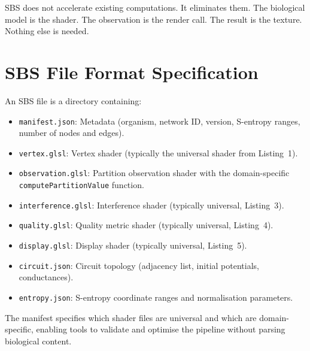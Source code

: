 \documentclass[11pt,twocolumn,a4paper]{article}
\begin{document}
SBS does not accelerate existing computations.  It eliminates them.
The biological model is the shader.  The observation is the render
call.  The result is the texture.  Nothing else is needed.








\appendix

\section{SBS File Format Specification}
\label{app:format}

An SBS file is a directory containing:

\begin{itemize}[leftmargin=*,nosep]
\item \texttt{manifest.json}: Metadata (organism, network ID, version,
  S-entropy ranges, number of nodes and edges).
\item \texttt{vertex.glsl}: Vertex shader (typically the universal
  shader from Listing~1).
\item \texttt{observation.glsl}: Partition observation shader with the
  domain-specific \texttt{computePartitionValue} function.
\item \texttt{interference.glsl}: Interference shader (typically
  universal, Listing~3).
\item \texttt{quality.glsl}: Quality metric shader (typically
  universal, Listing~4).
\item \texttt{display.glsl}: Display shader (typically universal,
  Listing~5).
\item \texttt{circuit.json}: Circuit topology (adjacency list, initial
  potentials, conductances).
\item \texttt{entropy.json}: S-entropy coordinate ranges and
  normalisation parameters.
\end{itemize}

The manifest specifies which shader files are universal and which are
domain-specific, enabling tools to validate and optimise the pipeline
without parsing biological content.
\end{document}
